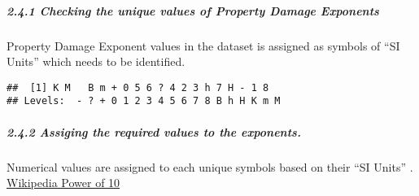 \documentclass[]{article}
\newenvironment{Shaded}{\begin{snugshade}}{\end{snugshade}}
\newcommand{\KeywordTok}[1]{\textcolor[rgb]{0.13,0.29,0.53}{\textbf{#1}}}
\newcommand{\NormalTok}[1]{#1}
\newcommand{\OperatorTok}[1]{\textcolor[rgb]{0.81,0.36,0.00}{\textbf{#1}}}
\let\oldsubparagraph\subparagraph
\renewcommand{\subparagraph}[1]{\oldsubparagraph{#1}\mbox{}}
\begin{document}
\hypertarget{checking-the-unique-values-of-property-damage-exponents}{%
\subparagraph{2.4.1 Checking the unique values of Property Damage
Exponents}\label{checking-the-unique-values-of-property-damage-exponents}}

Property Damage Exponent values in the dataset is assigned as symbols of
``SI Units'' which needs to be identified.

\begin{Shaded}
\end{Shaded}

\begin{verbatim}
##  [1] K M   B m + 0 5 6 ? 4 2 3 h 7 H - 1 8
## Levels:  - ? + 0 1 2 3 4 5 6 7 8 B h H K m M
\end{verbatim}

\hypertarget{assiging-the-required-values-to-the-exponents.}{%
\subparagraph{2.4.2 Assiging the required values to the
exponents.}\label{assiging-the-required-values-to-the-exponents.}}

Numerical values are assigned to each unique symbols based on their ``SI
Units'' . \href{https://en.wikipedia.org/wiki/Power_of_10}{Wikipedia
Power of 10}
\end{document}
